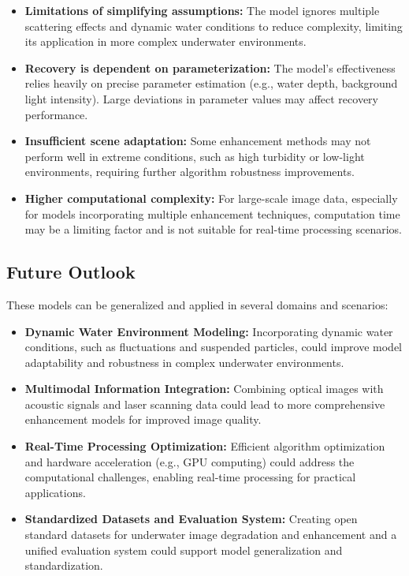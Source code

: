 \documentclass[withoutpreface,bwprint]{cumcmthesis}
\begin{document}
\begin{itemize}[itemindent=2em]

\item  \textbf{Limitations of simplifying assumptions:} The model ignores multiple scattering effects and dynamic water conditions to reduce complexity, limiting its application in more complex underwater environments.

\item  \textbf{Recovery is dependent on parameterization:}  The model's effectiveness relies heavily on precise parameter estimation (e.g., water depth, background light intensity). Large deviations in parameter values may affect recovery performance.

\item \textbf{Insufficient scene adaptation:} Some enhancement methods may not perform well in extreme conditions, such as high turbidity or low-light environments, requiring further algorithm robustness improvements.

\item \textbf{Higher computational complexity:} For large-scale image data, especially for models incorporating multiple enhancement techniques, computation time may be a limiting factor and is not suitable for real-time processing scenarios.

\end{itemize}

\subsection{Future Outlook}

These models can be generalized and applied in several domains and scenarios:

\begin{itemize}[itemindent=2em]
    \item \textbf{Dynamic Water Environment Modeling:} Incorporating dynamic water conditions, such as fluctuations and suspended particles, could improve model adaptability and robustness in complex underwater environments.

    \item \textbf{Multimodal Information Integration:} Combining optical images with acoustic signals and laser scanning data could lead to more comprehensive enhancement models for improved image quality.

    \item \textbf{Real-Time Processing Optimization: } Efficient algorithm optimization and hardware acceleration (e.g., GPU computing) could address the computational challenges, enabling real-time processing for practical applications.

    \item \textbf{Standardized Datasets and Evaluation System: } Creating open standard datasets for underwater image degradation and enhancement and a unified evaluation system could support model generalization and standardization.

    
\end{itemize}
\end{document}
